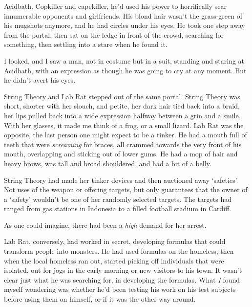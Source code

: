 Acidbath.  Copkiller and capekiller, he'd used his power to horrifically scar innumerable opponents and girlfriends.  His blond hair wasn't the grass-green of his mugshots anymore, and he had circles under his eyes.  He took one step away from the portal, then sat on the ledge in front of the crowd, searching for something, then settling into a stare when he found it.



I looked, and I saw a man, not in costume but in a suit, standing and staring at Acidbath, with an expression as though he was going to cry at any moment.  But he didn't avert his eyes.



String Theory and Lab Rat stepped out of the same portal.  String Theory was short, shorter with her slouch, and petite, her dark hair tied back into a braid, her lips pulled back into a wide expression halfway between a grin and a smile.  With her glasses, it made me think of a frog, or a small lizard.  Lab Rat was the opposite, the last person one might expect to be a tinker.  He had a mouth full of teeth that were \emph{screaming} for braces, all crammed towards the very front of his mouth, overlapping and sticking out of lower gums.  He had a mop of hair and heavy brows, was tall and broad shouldered, and had a bit of a belly.



String Theory had made her tinker devices and then auctioned away `safeties'.  Not uses of the weapon or offering targets, but only guarantees that the owner of a `safety' wouldn't be one of her randomly selected targets.  The targets had ranged from gas stations in Indonesia to a filled football stadium in Cardiff.



As one could imagine, there had been a \emph{high} demand for her arrest.



Lab Rat, conversely, had worked in secret, developing formulas that could transform people into monsters.  He had used formulas on the homeless, then when the local homeless ran out, started picking off individuals that were isolated, out for jogs in the early morning or new visitors to his town.  It wasn't clear just what he was searching for, in developing the formulas\emph{.  }What \emph{I} found myself wondering was whether he'd been testing his work on his test subjects before using them on himself, or if it was the other way around.



